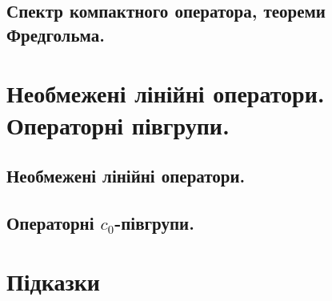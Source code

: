 \documentclass{extreport}
\begin{document}
        \section{Спектр компактного оператора, теореми Фредгольма.}
            
            
            

    \chapter{Необмежені лінійні оператори. Операторні півгрупи.}
        \section{Необмежені лінійні оператори.}
            
            
            
        \section{Операторні \texorpdfstring{$c_0$}{c0}-півгрупи.}
            
            
        \newpage
    \chapter*{Підказки}
        
\end{document}
